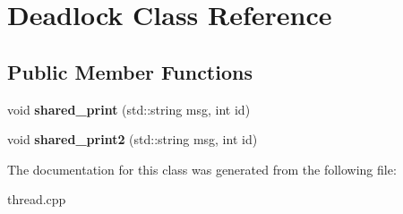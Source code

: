 \hypertarget{classDeadlock}{}\section{Deadlock Class Reference}
\label{classDeadlock}
\subsection*{Public Member Functions}
\begin{DoxyCompactItemize}
\item 
void {\bfseries shared\+\_\+print} (std\+::string msg, int id)\hypertarget{classDeadlock_ae7d85357ad266206280d9e30d771d908}{}\label{classDeadlock_ae7d85357ad266206280d9e30d771d908}

\item 
void {\bfseries shared\+\_\+print2} (std\+::string msg, int id)\hypertarget{classDeadlock_aebe08dfc02f677de9ce087948600b68e}{}\label{classDeadlock_aebe08dfc02f677de9ce087948600b68e}

\end{DoxyCompactItemize}


The documentation for this class was generated from the following file\+:\begin{DoxyCompactItemize}
\item 
thread.\+cpp\end{DoxyCompactItemize}
